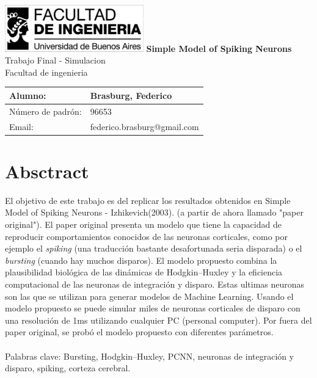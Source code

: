 \documentclass[12pt]{article}
\begin{document}
\begin{titlepage} %
	\hfill\includegraphics[width=6cm]{images/logofiuba.jpg}
    \centering
    \vfill
    \Huge \textbf{Simple Model of Spiking Neurons}
    \vskip2cm
    \Large Trabajo Final - Simulacion \\
    Facultad de ingenieria\\ %
    \vskip2cm
    \begin{tabular}{ | l | l | } %
      \hline
      Alumno: & Brasburg, Federico \\ \hline
      Número de padrón: & 96653 \\ \hline
      Email: & federico.brasburg@gmail.com \\ \hline
    \end{tabular}
    \vskip2cm
    \vfill
    \vfill
\end{titlepage}

\tableofcontents %
\newpage

\section{Absctract}\label{sec:intro}
El objetivo de este trabajo es del replicar los resultados obtenidos en Simple Model of Spiking Neurons - Izhikevich(2003). \cite{paperOriginal} (a partir de ahora llamado "paper original").
El paper original presenta un modelo que tiene la capacidad de reproducir comportamientos conocidos de las neuronas corticales, como por ejemplo el \textit{spiking} (una traducción bastante desafortunada seria disparada)
o el \textit{bursting} (cuando hay muchos disparos). El modelo propuesto combina la plausibilidad biológica de las dinámicas de Hodgkin–Huxley \cite{HodgkinHuxley} y la eficiencia computacional de las neuronas de integración y disparo.
Estas ultimas neuronas son las que se utilizan para generar modelos de Machine Learning. Usando el modelo propuesto se puede simular miles de neuronas corticales de disparo con una resolución de 1ms utilizando cualquier PC (personal computer).
Por fuera del paper original, se probó el modelo propuesto con diferentes parámetros.
\\ \\
Palabras clave: Bursting, Hodgkin–Huxley, PCNN, neuronas de integración y disparo, spiking, corteza cerebral.
\newpage
\end{document}
